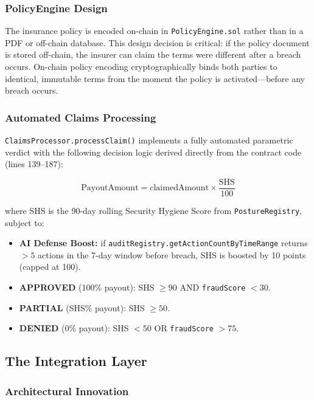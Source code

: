 \documentclass[12pt,a4paper]{article}
\begin{document}
\subsubsection{PolicyEngine Design}

The insurance policy is encoded on-chain in \texttt{PolicyEngine.sol}
rather than in a PDF or off-chain database. This design decision is
critical: if the policy document is stored off-chain, the insurer can
claim the terms were different after a breach occurs. On-chain policy
encoding cryptographically binds both parties to identical, immutable
terms from the moment the policy is activated---before any breach occurs.

\subsubsection{Automated Claims Processing}

\texttt{ClaimsProcessor.processClaim()} implements a fully automated
parametric verdict with the following decision logic derived directly
from the contract code (lines 139--187):

\begin{equation}
\label{eq:payout}
\text{PayoutAmount} = \text{claimedAmount} \times \frac{\text{SHS}}{100}
\end{equation}

where SHS is the 90-day rolling Security Hygiene Score from
\texttt{PostureRegistry}, subject to:
\begin{itemize}
  \item \textbf{AI Defense Boost:} if \texttt{auditRegistry.getActionCountByTimeRange}
        returns $> 5$ actions in the 7-day window before breach,
        SHS is boosted by 10 points (capped at 100).
  \item \textbf{APPROVED} (100\% payout): SHS $\geq 90$ AND
        \texttt{fraudScore} $< 30$.
  \item \textbf{PARTIAL} (SHS\% payout): SHS $\geq 50$.
  \item \textbf{DENIED} (0\% payout): SHS $< 50$ OR
        \texttt{fraudScore} $> 75$.
\end{itemize}

\subsection{The Integration Layer}
\label{sec:integration}

\subsubsection{Architectural Innovation}
\end{document}
